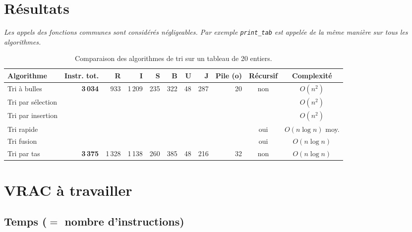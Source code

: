 \documentclass[11pt,a4paper]{article}
\begin{document}
\section{Résultats}

\emph{Les appels des fonctions communes sont considérés négligeables. Par exemple \texttt{print\_tab} est appelée de la même manière sur tous les algorithmes.}

\begin{table}[h]
\centering
\footnotesize
\setlength{\tabcolsep}{4pt}
\begin{tabular}{lrrrrrrrrcc}
\toprule
\textbf{Algorithme} & \textbf{Instr. tot.} & \textbf{R} & \textbf{I} & \textbf{S} & \textbf{B} & \textbf{U} & \textbf{J} & \textbf{Pile (o)} & \textbf{Récursif} & \textbf{Complexité} \\
\midrule
Tri à bulles       & \textbf{3\,034} & 933 & 1\,209 & 235 & 322 & 48 & 287 & 20 & non & $O(n^2)$ \\
Tri par sélection  &                 &     &        &     &     &    &     &    &     & $O(n^2)$ \\
Tri par insertion  &                 &     &        &     &     &    &     &    &     & $O(n^2)$ \\
Tri rapide         &                 &     &        &     &     &    &     &    & oui & $O(n \log n)$ moy. \\
Tri fusion         &                 &     &        &     &     &    &     &    & oui & $O(n \log n)$ \\
Tri par tas        & \textbf{3\,375} & 1\,328 & 1\,138 & 260 & 385 & 48 & 216 & 32 & non & $O(n \log n)$ \\
\bottomrule
\end{tabular}
\caption{Comparaison des algorithmes de tri sur un tableau de 20 entiers.}
\label{tab:resultats}
\end{table}

\section{VRAC à travailler}

\subsection{Temps ($=$ nombre d'instructions)}
\end{document}
